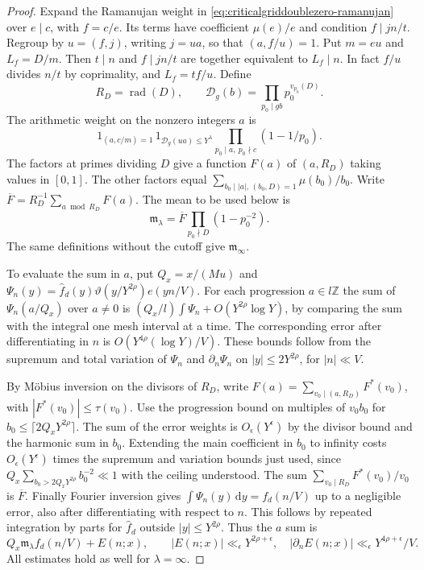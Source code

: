 \documentclass[11pt,a4paper]{article}
\numberwithin{equation}{section}
\newcommand{\ud}{\mathrm d}
\begin{document}
\begin{proof}
Expand the Ramanujan weight in \cref{eq:criticalgriddoublezero-ramanujan}
over $e\mid c$, with $f=c/e$. Its terms have coefficient
$\mu(e)/e$ and condition $f\mid jn/t$.
Regroup by $u=(f,j)$, writing $j=u a$, so that
$(a,f/u)=1$. Put $m=eu$ and $L_f=D/m$. Then
$t\mid n$ and $f\mid jn/t$ are together equivalent to
$L_f\mid n$. In fact $f/u$ divides $n/t$ by coprimality,
and $L_f=t f/u$.
Define
\[
 R_D=\operatorname{rad}(D),\qquad
 \mathcal D_g(b)=\prod_{p_0\mid gb}p_0^{v_{p_0}(D)} .
\]
The arithmetic weight on the nonzero integers $a$ is
\[
 1_{(a,c/m)=1}\,1_{\mathcal D_g(ua)\le Y^\lambda}
                 \prod_{p_0\mid a,\ p_0\nmid c}(1-1/p_0).
\]
The factors at primes dividing $D$ give a function
$F(a)$ of $(a,R_D)$ taking values in $[0,1]$.
The other factors equal
$\sum_{b_0\mid |a|,\,(b_0,D)=1}\mu(b_0)/b_0$.
Write $\overline F=R_D^{-1}\sum_{a\bmod R_D}F(a)$.
The mean to be used below is
\begin{equation}
 \mathfrak m_\lambda
    =\overline F\prod_{p_0\nmid D}(1-p_0^{-2}).
 \label{eq:criticalgriddoublezero-density}
\end{equation}
The same definitions without the cutoff give
$\mathfrak m_\infty$.

To evaluate the sum in $a$, put $Q_x=x/(M u)$ and
$\Psi_n(y)=\widehat f_d(y)\vartheta(y/Y^{2\rho})e(yn/V)$.
For each progression $a\in l\mathbb Z$ the sum of
$\Psi_n(a/Q_x)$ over $a\ne0$ is
$(Q_x/l)\int\Psi_n+O(Y^{2\rho}\log Y)$, by comparing
the sum with the integral one mesh interval at a time.
The corresponding error after differentiating in $n$
is $O(Y^{4\rho}(\log Y)/V)$. These bounds follow from
the supremum and total variation of $\Psi_n$ and
$\partial_n\Psi_n$ on $|y|\le2Y^{2\rho}$, for
$|n|\ll V$.

By M\"obius inversion on the divisors of $R_D$, write
$F(a)=\sum_{v_0\mid(a,R_D)}F^*(v_0)$, with
$|F^*(v_0)|\le\tau(v_0)$. Use the progression bound on
multiples of $v_0b_0$ for $b_0\le\lceil2Q_xY^{2\rho}\rceil$.
The sum of the error weights is $O_\epsilon(Y^\epsilon)$
by the divisor bound and the harmonic sum in $b_0$.
Extending the main coefficient in $b_0$ to infinity
costs $O_\epsilon(Y^\epsilon)$ times the supremum
and variation bounds just used, since
$Q_x\sum_{b_0>2Q_xY^{2\rho}}b_0^{-2}\ll1$
with the ceiling understood.
The sum $\sum_{v_0\mid R_D} F^*(v_0)/v_0$ is
$\overline F$. Finally Fourier inversion gives
$\int\Psi_n(y)\,\ud y=f_d(n/V)$ up to a negligible
error, also after differentiating with respect to $n$.
This follows by repeated integration by parts for
$\widehat f_d$ outside $|y|\le Y^{2\rho}$.
Thus the $a$ sum is
\begin{equation}
  Q_x\mathfrak m_\lambda f_d(n/V)+E(n;x),\qquad
 |E(n;x)|\ll_\epsilon Y^{2\rho+\epsilon},\quad
 |\partial_n E(n;x)|\ll_\epsilon Y^{4\rho+\epsilon}/V .
 \label{eq:criticalgriddoublezero-lattice}
\end{equation}
All estimates hold as well for $\lambda=\infty$.


\end{proof}
\end{document}

